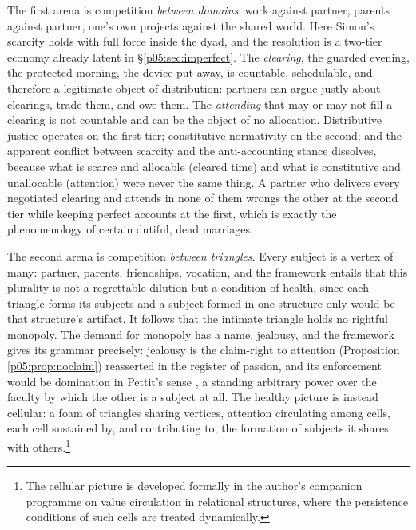 The first arena is competition \emph{between domains}: work against partner, parents against partner, one's own projects against the shared world. Here Simon's scarcity holds with full force inside the dyad, and the resolution is a two-tier economy already latent in §\ref{p05:sec:imperfect}. The \emph{clearing}, the guarded evening, the protected morning, the device put away, is countable, schedulable, and therefore a legitimate object of distribution: partners can argue justly about clearings, trade them, and owe them. The \emph{attending} that may or may not fill a clearing is not countable and can be the object of no allocation. Distributive justice operates on the first tier; constitutive normativity on the second; and the apparent conflict between scarcity and the anti-accounting stance dissolves, because what is scarce and allocable (cleared time) and what is constitutive and unallocable (attention) were never the same thing. A partner who delivers every negotiated clearing and attends in none of them wrongs the other at the second tier while keeping perfect accounts at the first, which is exactly the phenomenology of certain dutiful, dead marriages.

The second arena is competition \emph{between triangles}. Every subject is a vertex of many: partner, parents, friendships, vocation, and the framework entails that this plurality is not a regrettable dilution but a condition of health, since each triangle forms its subjects and a subject formed in one structure only would be that structure's artifact. It follows that the intimate triangle holds no rightful monopoly. The demand for monopoly has a name, jealousy, and the framework gives its grammar precisely: jealousy is the claim-right to attention (Proposition \ref{p05:prop:noclaim}) reasserted in the register of passion, and its enforcement would be domination in Pettit's sense \parencite{pettit1997}, a standing arbitrary power over the faculty by which the other is a subject at all. The healthy picture is instead cellular: a foam of triangles sharing vertices, attention circulating among cells, each cell sustained by, and contributing to, the formation of subjects it shares with others.\footnote{The cellular picture is developed formally in the author's companion programme on value circulation in relational structures, where the persistence conditions of such cells are treated dynamically.}

